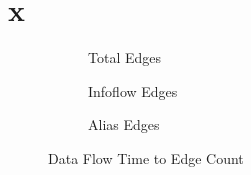 \documentclass[../draft.tex]{subfiles}
\begin{document}



    \FloatBarrier
    \section{x}
    \begin{figure}[tbp]
        \centering
        \begin{subfigure}[b]{\textwidth}
            \centering
            \begin{subfigure}[]{0.45\textwidth}
                \centering
                \resizebox{\columnwidth}{!}{
                    
                }
            \end{subfigure}
            \qquad
            \begin{subfigure}[]{0.45\textwidth}
                \centering
                \resizebox{\columnwidth}{!}{
                    
                }
            \end{subfigure}
            \caption{Total Edges}
        \end{subfigure}
        \bigbreak
        \begin{subfigure}[b]{\textwidth}
            \centering
            \begin{subfigure}[]{0.45\textwidth}
                \centering
                \resizebox{\columnwidth}{!}{
                    
                }
            \end{subfigure}
            \qquad
            \begin{subfigure}[]{0.45\textwidth}
                \centering
                \resizebox{\columnwidth}{!}{
                    
                }
            \end{subfigure}
            \caption{Infoflow Edges}
        \end{subfigure}
        \bigbreak
        \begin{subfigure}[b]{\textwidth}
            \centering
            \begin{subfigure}[]{0.45\textwidth}
                \centering
                \resizebox{\columnwidth}{!}{
                    
                }
            \end{subfigure}
            \qquad
            \begin{subfigure}[]{0.45\textwidth}
                \centering
                \resizebox{\columnwidth}{!}{
                    
                }
            \end{subfigure}
            \caption{Alias Edges}
        \end{subfigure}
        \caption{Data Flow Time to Edge Count}
    \end{figure}
\end{document}
